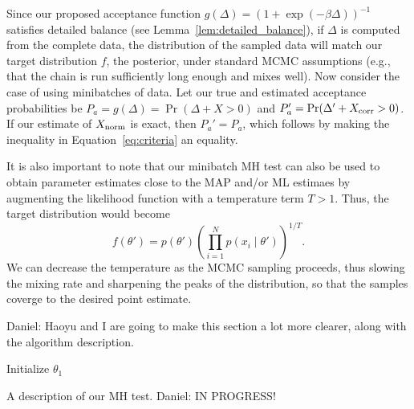 \documentclass{article}
\begin{document}
Since our proposed acceptance function $g(\Delta) = (1+ \exp(-\beta \Delta))^{-1}$ satisfies
detailed balance (see Lemma~\ref{lem:detailed_balance}), if $\Delta$ is computed from the complete
data, the distribution of the sampled data will match our target distribution $f$, the posterior,
under standard MCMC assumptions (e.g., that the chain is run sufficiently long enough and mixes
well). Now consider the case of using minibatches of data. Let our true and estimated acceptance
probabilities be $P_a = g(\Delta) = \Pr(\Delta + X > 0)$ and $P_a' = \Pr(\Delta' + X_{\rm corr} >
0)$.  If our estimate of $X_{\rm norm}$ is exact, then $P_a' = P_a$, which follows by making the
inequality in Equation~\ref{eq:criteria} an equality.

It is also important to note that our minibatch MH test can also be used to obtain parameter
estimates close to the MAP and/or ML estimaes by augmenting the likelihood function with a
temperature term $T > 1$. Thus, the target distribution would become
\begin{equation}\label{eq:temperature}
f(\theta') = p(\theta')\left ( \prod_{i=1}^N p(x_i \mid \theta') \right)^{1/T}.
\end{equation}
We can decrease the temperature as the MCMC sampling proceeds, thus slowing the mixing rate and
sharpening the peaks of the distribution, so that the samples coverge to the desired point estimate.

{\color{blue}
Daniel: Haoyu and I are going to make this section a lot more clearer, along with the algorithm
description.
}


\begin{algorithm}[t]
Initialize $\theta_1$\;
\caption{A description of our MH test. {\color{blue} Daniel: IN PROGRESS!}}
\label{alg:our_algorithm}
\end{algorithm}
\end{document}
